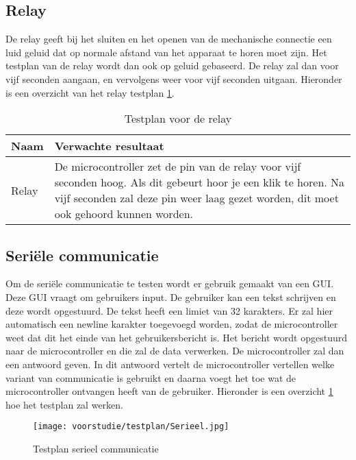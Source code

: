 \subsection{Relay}
De relay geeft bij het sluiten en het openen van de mechanische connectie een luid geluid dat op normale afstand van het apparaat te horen moet zijn. Het testplan van de relay wordt dan ook op geluid gebaseerd. De relay zal dan voor vijf seconden aangaan, en vervolgens weer voor vijf seconden uitgaan. Hieronder is een overzicht van het relay testplan \ref{tab:hw_val_relay_testplan}.

\begin{table}[h!]
	\caption{Testplan voor de relay}
	\begin{tabular}{lp{14.5cm}}
	\toprule
	\textbf{Naam} 	& \textbf{Verwachte resultaat} \\ \toprule
	Relay			& De microcontroller zet de pin van de relay voor vijf seconden hoog. Als dit gebeurt hoor je een klik te horen. Na vijf seconden zal deze pin weer laag gezet worden, dit moet ook gehoord kunnen worden.\\  \bottomrule
	\end{tabular}
	\label{tab:hw_val_relay_testplan}
\end{table}


\subsection{Seriële communicatie}
Om de seriële communicatie te testen wordt er gebruik gemaakt van een GUI. Deze GUI vraagt om gebruikers input. De gebruiker kan een tekst schrijven en deze wordt opgestuurd. De tekst heeft een limiet van 32 karakters. Er zal hier automatisch een newline karakter toegevoegd worden, zodat de microcontroller weet dat dit het einde van het gebruikersbericht is. Het bericht wordt opgestuurd naar de microcontroller en die zal de data verwerken. De microcontroller zal dan een antwoord geven. In dit antwoord vertelt de microcontroller vertellen welke variant van communicatie is gebruikt en daarna voegt het toe wat de microcontroller ontvangen heeft van de gebruiker. Hieronder is een overzicht \ref{fig:testplanserieel} hoe het testplan zal werken.

\begin{figure}[h!]
	\centering

	\label{fig:testplanserieel}
	\texttt{[image: voorstudie/testplan/Serieel.jpg]}
	\caption{Testplan serieel communicatie}
\end{figure}

